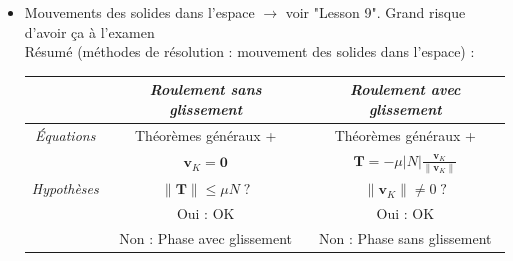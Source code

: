 \documentclass[a4paper]{article}
\begin{document}
\begin{itemize}
\item Mouvements des solides dans l'espace $ \longrightarrow $ voir "Lesson 9". \danger Grand risque d'avoir ça à l'examen \danger \\
Résumé (méthodes de résolution : mouvement des solides dans l'espace) : 
\begin{center} \begin{tabular}{c|c|c}
& \emph{Roulement sans glissement}    & \emph{Roulement avec glissement} \\ \hline
\emph{Équations}    & Théorèmes généraux +  & Théorèmes généraux + \\
& $\displaystyle \textbf{v}_K = \textbf{0} $ & $\displaystyle \textbf{T} = - \mu | N | \frac{\textbf{v}_K}{\| \textbf{v}_K \|} $ \\[0.3cm] \hline
\emph{Hypothèses}   & $ \| \textbf{T} \| \leq \mu N \; ? $ & $ \| \textbf{v}_K \| \neq 0 \; ? $ \\
& Oui : OK & Oui : OK \\[-0.4cm]
& Non : Phase avec glissement & Non : Phase sans glissement
\end{tabular} \end{center}





\end{itemize}
\end{document}

